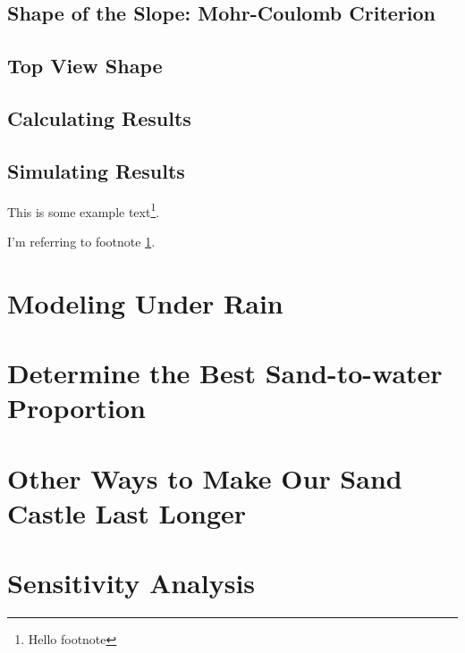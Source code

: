 \documentclass[12pt]{article}
\begin{document}
\subsection{Shape of the Slope: Mohr-Coulomb Criterion}


\subsection{Top View Shape}
\subsection{Calculating Results}
\subsection{Simulating Results}
This is some example text\footnote{\label{myfootnote}Hello footnote}.

I'm referring to footnote \ref{myfootnote}.

\section{Modeling Under Rain}

\section{Determine the Best Sand-to-water Proportion}

\section{Other Ways to Make Our Sand Castle Last Longer}

\section{Sensitivity Analysis}

\newpage
\begin{appendix}
    \listoffigures
    \listoftables
    \listoflistings
    \printbibliography
\end{appendix}
\end{document}
